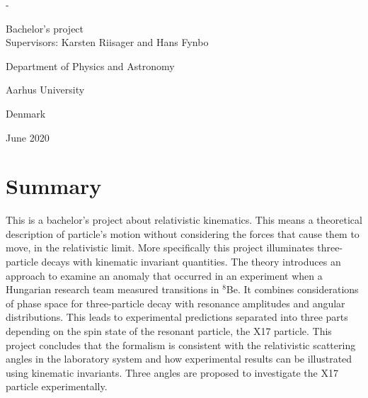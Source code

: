 \begin{titlingpage}
\begin{adjustwidth*}{\frontpagecorrection}{-\frontpagecorrection}
\begin{tikzpicture}[x=0.75pt,y=0.75pt,yscale=-1,xscale=1]
\end{tikzpicture}

			
		\vspace{1cm}
		
		Bachelor's project \\
		Supervisors: Karsten Riisager and Hans Fynbo
		\vspace{1.0cm}
		
		\fontsize{13pt}{14pt}\selectfont
		
		Department of Physics and Astronomy\par
		Aarhus University\par
		Denmark
		
		\vspace{0.3cm}
		
		June 2020
		
	\end{adjustwidth*}
\end{titlingpage}



\setcounter{page}{2}

\vspace*{-0.5cm}
\section*{Summary}
\thispagestyle{empty}
This is a bachelor's project about relativistic kinematics. This means a theoretical description of particle's motion without considering the forces that cause them to move, in the relativistic limit. More specifically this project illuminates three-particle decays with kinematic invariant quantities. The theory introduces an approach to examine an anomaly that occurred in an experiment when a Hungarian research team measured transitions in $^8$Be. It combines considerations of phase space for three-particle decay with resonance amplitudes and angular distributions. This leads to experimental predictions separated into three parts depending on the spin state of the resonant particle, the X17 particle. This project concludes that the formalism is consistent with the relativistic scattering angles in the laboratory system and how experimental results can be illustrated using kinematic invariants. Three angles are proposed to investigate the X17 particle experimentally.  
\vspace{1cm}
